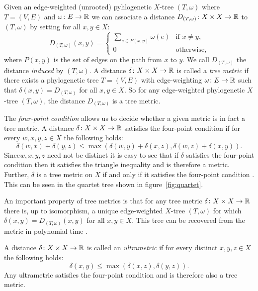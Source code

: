 Given an edge-weighted (unrooted) pyhlogenetic $X$-tree $(T,\omega)$ where
$T=(V,E)$ and $\omega \colon E \to {\mathbb R}$ we can associate a distance
$D_{(T,\omega)} \colon X \times X \to {\mathbb R}$ to $(T,\omega)$ by setting for all
$x,y \in X$:
\begin{equation*}
  D_{(T,\omega)}(x,y) =
  \begin{cases}
    \displaystyle
    \sum_{e \in P(x,y)} \omega(e) & \text{if $x \neq y$},\\
    0 & \text{otherwise,}
  \end{cases}
\end{equation*}
where $P(x,y)$ is the set of edges on the path from $x$ to $y$.  We call
$D_{(T,\omega)}$ the distance \textit{induced} by $(T,\omega)$.  A distance
$\delta \colon X \times X \to {\mathbb R}$ is called a \textit{tree metric} if there
exists a phylogenetic tree $T=(V,E)$ with edge-weighting $\omega \colon E \to
{\mathbb R}$ such that $\delta(x,y) = D_{(T,\omega)}$ for all $x,y \in X$.  So for any
edge-weighted phylogenetic $X$-tree $(T,\omega)$, the distance
$D_{(T,\omega)}$ is a tree metric.

The \textit{four-point condition} allows us to decide whether a given metric
is in fact a tree metric.  A distance $\delta \colon X \times X \to {\mathbb R}$
satisfies the four-point condition if for every $w,x,y,z \in X$ the following
holds:
\begin{equation*}
  \delta(w,x) + \delta(y,z) \leq \max(\delta(w,y)+\delta(x,z),
                                      \delta(w,z)+\delta(x,y)).
\end{equation*}
Since$w,x,y,z$ need not be distinct it is easy to see that if $\delta$
satisfies the four-point condition then it satisfies the triangle inequality
and is therefore a metric.  Further, $\delta$ is a tree metric on $X$ if and
only if it satisfies the four-point condition \citep{semple2003phylogenetics}.
This can be seen in the quartet tree shown in figure~\ref{fig:quartet}.

An important property of tree metrics is that for any tree metric $\delta
\colon X \times X \to {\mathbb R}$ there is, up to isomorphism, a unique edge-weighted
$X$-tree $(T,\omega)$ for which $\delta(x,y) = D_{(T,\omega)}(x,y)$ for all
$x,y \in X$.  This tree can be recovered from the metric in polynomial time
\citep{semple2003phylogenetics}.

A distance $\delta \colon X \times X \to {\mathbb R}$ is called an
\textit{ultrametric} if for every distinct $x,y,z \in X$ the following holds:
\begin{equation*}
  \delta(x,y) \leq \max(\delta(x,z),\delta(y,z)).
\end{equation*}
Any ultrametric satisfies the four-point condition and is therefore also a
tree metric.

